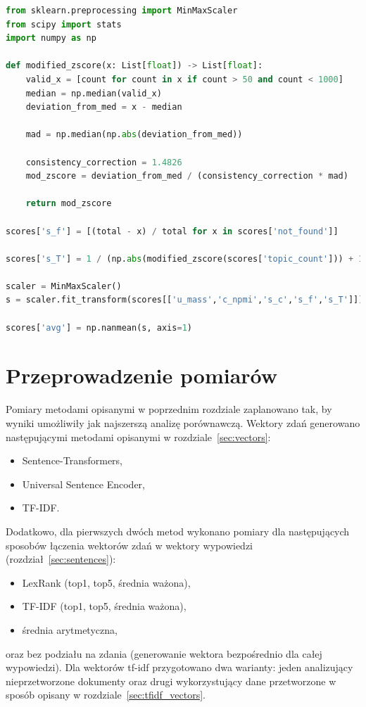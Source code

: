 		\begin{lstlisting}[label=lst:final_score,language=Python,caption=Obliczanie finalnej oceny spójności tematów dla listy modeli]
from sklearn.preprocessing import MinMaxScaler
from scipy import stats
import numpy as np

def modified_zscore(x: List[float]) -> List[float]:
	valid_x = [count for count in x if count > 50 and count < 1000]
	median = np.median(valid_x)
	deviation_from_med = x - median

	mad = np.median(np.abs(deviation_from_med))

	consistency_correction = 1.4826
	mod_zscore = deviation_from_med / (consistency_correction * mad)

	return mod_zscore

scores['s_f'] = [(total - x) / total for x in scores['not_found']]

scores['s_T'] = 1 / (np.abs(modified_zscore(scores['topic_count'])) + 1)

scaler = MinMaxScaler()
s = scaler.fit_transform(scores[['u_mass','c_npmi','s_c','s_f','s_T']])

scores['avg'] = np.nanmean(s, axis=1)
		\end{lstlisting}

\section{Przeprowadzenie pomiarów}\label{sec:test_plan}
	Pomiary metodami opisanymi w poprzednim rozdziale zaplanowano tak, by wyniki umożliwiły jak najszerszą analizę porównawczą.
	Wektory zdań generowano następującymi metodami opisanymi w rozdziale~\ref{sec:vectors}:
	\begin{itemize}
		\item Sentence-Transformers,
		\item Universal Sentence Encoder,
		\item TF-IDF\@.
	\end{itemize}
	Dodatkowo, dla pierwszych dwóch metod wykonano pomiary dla następujących sposobów łączenia wektorów zdań w wektory wypowiedzi (rozdział~\ref{sec:sentences}):
	\begin{itemize}
		\item LexRank (top1, top5, średnia ważona),
		\item TF-IDF (top1, top5, średnia ważona),
		\item średnia arytmetyczna,
	\end{itemize}
	oraz bez podziału na zdania (generowanie wektora bezpośrednio dla całej wypowiedzi).
	Dla wektorów tf-idf przygotowano dwa warianty: jeden analizujący nieprzetworzone dokumenty
		oraz drugi wykorzystujący dane przetworzone w sposób opisany w rozdziale~\ref{sec:tfidf_vectors}.

